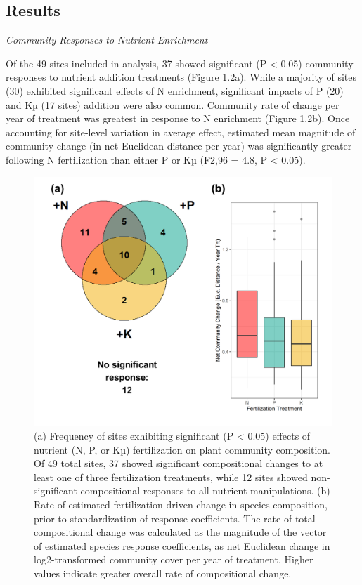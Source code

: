 \documentclass[twoside,12pt,final]{ucthesis-CA2012}
\begin{document}
\begin{ucmainmatter}
\hypertarget{results}{%
\section{Results}\label{results}}

\emph{Community Responses to Nutrient Enrichment}

Of the 49 sites included in analysis, 37 showed significant (P \textless{} 0.05) community responses to nutrient addition treatments (Figure 1.2a). While a majority of sites (30) exhibited significant effects of N enrichment, significant impacts of P (20) and Kµ (17 sites) addition were also common. Community rate of change per year of treatment was greatest in response to N enrichment (Figure 1.2b). Once accounting for site-level variation in average effect, estimated mean magnitude of community change (in net Euclidean distance per year) was significantly greater following N fertilization than either P or Kµ (F2,96 = 4.8, P \textless{} 0.05).
\begin{figure}
\centering
\includegraphics[width=\textwidth,height=0.6\textheight]{figure/Fig1_2.png}
\caption{\newline (a) Frequency of sites exhibiting significant (P \textless{} 0.05) effects of nutrient (N, P, or Kµ) fertilization on plant community composition. Of 49 total sites, 37 showed significant compositional changes to at least one of three fertilization treatments, while 12 sites showed non-significant compositional responses to all nutrient manipulations. \newline (b) Rate of estimated fertilization-driven change in species composition, prior to standardization of response coefficients. The rate of total compositional change was calculated as the magnitude of the vector of estimated species response coefficients, as net Euclidean change in log2-transformed community cover per year of treatment. Higher values indicate greater overall rate of compositional change. \label{fig-1-2}}
\end{figure}
\newline


\end{ucmainmatter}
\end{document}
